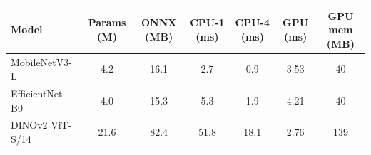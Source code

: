 \begin{tabular}{lcccccc}\toprule
Model & Params (M) & ONNX (MB) & CPU-1 (ms) & CPU-4 (ms) & GPU (ms) & GPU mem (MB) \\\midrule
MobileNetV3-L & 4.2 & 16.1 & 2.7 & 0.9 & 3.53 & 40 \\
EfficientNet-B0 & 4.0 & 15.3 & 5.3 & 1.9 & 4.21 & 40 \\
DINOv2 ViT-S/14 & 21.6 & 82.4 & 51.8 & 18.1 & 2.76 & 139 \\
\bottomrule\end{tabular}
